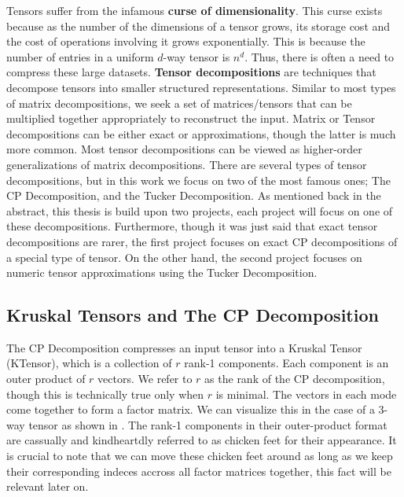 
Tensors suffer from the infamous \textbf{curse of dimensionality}. This curse
exists because as the number of the dimensions of a tensor grows, its storage
cost and the cost of operations involving it grows exponentially. This is
because the number of entries in a uniform $d$-way tensor is $n^d$. Thus, there
is often a need to compress these large datasets. \textbf{Tensor decompositions}
are techniques that decompose tensors into smaller structured representations.
Similar to most types of matrix decompositions, we seek a set of
matrices/tensors that can be multiplied together appropriately to reconstruct
the input. Matrix or Tensor decompositions can be either exact or
approximations, though the latter is much more common. Most tensor
decompositions can be viewed as higher-order generalizations of matrix
decompositions. There are several types of tensor decompositions, but in this
work we focus on two of the most famous ones; The CP Decomposition, and the
Tucker Decomposition. As mentioned back in the abstract, this thesis is build
upon two projects, each project will focus on one of these decompositions.
Furthermore, though it was just said that exact tensor decompositions are rarer,
the first project focuses on exact CP decompositions of a special type of
tensor. On the other hand, the second project focuses on numeric tensor
approximations using the Tucker Decomposition. 


\subsection{Kruskal Tensors and The CP Decomposition} \label{sec:Kruskal Tensors
    and The CP Decomposition} The CP Decomposition compresses an input tensor
    into a Kruskal Tensor (KTensor), which is a collection of $r$ rank-1
    components. Each component is an outer product of $r$ vectors. We refer to
    $r$ as the rank of the CP decomposition, though this is technically true
    only when $r$ is minimal. The vectors in each mode come together to form a
    factor matrix. We can visualize this in the case of a 3-way tensor as shown
    in . The rank-1 components in their outer-product format
    are cassually and kindheartdly referred to as chicken feet for their
    appearance. It is crucial to note that we can move these chicken feet around
    as long as we keep their corresponding indeces accross all factor matrices
    together, this fact will be relevant later on.

